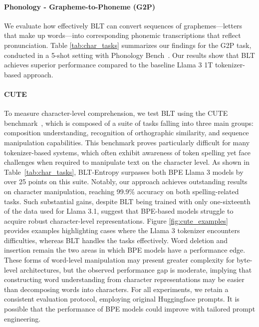 \paragraph{Phonology - Grapheme-to-Phoneme (G2P)} We evaluate how effectively {\textsc BLT} can convert sequences of graphemes—letters that make up words—into corresponding phonemic transcriptions that reflect pronunciation. Table \ref{tab:char_tasks} summarizes our findings for the G2P task, conducted in a 5-shot setting with Phonology Bench~\citep{suvarna2024phonologybench}. Our results show that {\textsc BLT} achieves superior performance compared to the baseline Llama 3 1T tokenizer-based approach.

\paragraph{CUTE}
To measure character-level comprehension, we test {\textsc BLT} using the CUTE benchmark~\citep{edman2024cute}, which is composed of a suite of tasks falling into three main groups: composition understanding, recognition of orthographic similarity, and sequence manipulation capabilities. This benchmark proves particularly difficult for many tokenizer-based systems, which often exhibit awareness of token spelling yet face challenges when required to manipulate text on the character level. As shown in Table~\ref{tab:char_tasks}, {\textsc BLT}-Entropy surpasses both BPE Llama 3 models by over 25 points on this suite. Notably, our approach achieves outstanding results on character manipulation, reaching 99.9\% accuracy on both spelling-related tasks. Such substantial gains, despite {\textsc BLT} being trained with only one-sixteenth of the data used for Llama 3.1, suggest that BPE-based models struggle to acquire robust character-level representations. Figure \ref{fig:cute_examples} provides examples highlighting cases where the Llama 3 tokenizer encounters difficulties, whereas {\textsc BLT} handles the tasks effectively. Word deletion and insertion remain the two areas in which BPE models have a performance edge. These forms of word-level manipulation may present greater complexity for byte-level architectures, but the observed performance gap is moderate, implying that constructing word understanding from character representations may be easier than decomposing words into characters. For all experiments, we retain a consistent evaluation protocol, employing original Huggingface prompts. It is possible that the performance of BPE models could improve with tailored prompt engineering.

